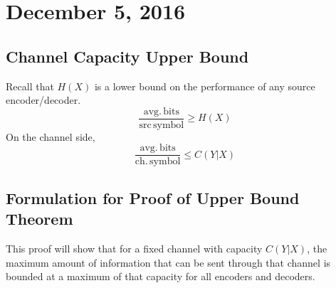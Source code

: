\documentclass[11pt]{article}
\theoremstyle{definition}
\begin{document}
\newpage
\section{December 5, 2016}

\subsection{Channel Capacity Upper Bound}

Recall that $H(X)$ is a lower bound on the performance of any source encoder/decoder. 
$$\frac{\mathrm{avg. \, bits}}{\mathrm{src \, symbol}} \geq H(X)$$
On the channel side, 
$$\frac{\mathrm{avg. \, bits}}{\mathrm{ch. \, symbol}} \leq C(Y|X)$$

\subsection{Formulation for Proof of Upper Bound Theorem}
This proof will show that for a fixed channel with capacity $C(Y|X)$, the maximum amount of information that can be sent through that channel is bounded at a maximum of that capacity for all encoders and decoders.
\end{document}
